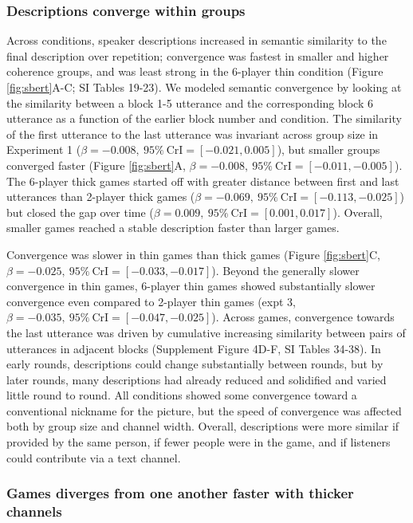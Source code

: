\documentclass[
  english,
]{article}
\begin{document}
\hypertarget{descriptions-converge-within-groups}{%
\subsubsection{Descriptions converge within groups}\label{descriptions-converge-within-groups}}

Across conditions, speaker descriptions increased in semantic similarity to the final description over repetition; convergence was fastest in smaller and higher coherence groups, and was least strong in the 6-player thin condition (Figure \ref{fig:sbert}A-C; SI Tables 19-23).
We modeled semantic convergence by looking at the similarity between a block 1-5 utterance and the corresponding block 6 utterance as a function of the earlier block number and condition.
The similarity of the first utterance to the last utterance was invariant across group size in Experiment 1 (\(\beta=-0.008,\:95\%\:\mathrm{CrI}=[-0.021, 0.005]\)), but smaller groups converged faster (Figure \ref{fig:sbert}A, \(\beta=-0.008,\:95\%\:\mathrm{CrI}=[-0.011, -0.005]\)).
The 6-player thick games started off with greater distance between first and last utterances than 2-player thick games (\(\beta=-0.069,\:95\%\:\mathrm{CrI}=[-0.113, -0.025]\)) but closed the gap over time (\(\beta=0.009,\:95\%\:\mathrm{CrI}=[0.001, 0.017]\)).
Overall, smaller games reached a stable description faster than larger games.

Convergence was slower in thin games than thick games (Figure \ref{fig:sbert}C, \(\beta=-0.025,\:95\%\:\mathrm{CrI}=[-0.033, -0.017]\)).
Beyond the generally slower convergence in thin games, 6-player thin games showed substantially slower convergence even compared to 2-player thin games (expt 3, \(\beta=-0.035,\:95\%\:\mathrm{CrI}=[-0.047, -0.025]\)).
Across games, convergence towards the last utterance was driven by cumulative increasing similarity between pairs of utterances in adjacent blocks (Supplement Figure 4D-F, SI Tables 34-38). In early rounds, descriptions could change substantially between rounds, but by later rounds, many descriptions had already reduced and solidified and varied little round to round.
All conditions showed some convergence toward a conventional nickname for the picture, but the speed of convergence was affected both by group size and channel width. Overall, descriptions were more similar if provided by the same person, if fewer people were in the game, and if listeners could contribute via a text channel.

\hypertarget{games-diverges-from-one-another-faster-with-thicker-channels}{%
\subsubsection{Games diverges from one another faster with thicker channels}\label{games-diverges-from-one-another-faster-with-thicker-channels}}
\end{document}
